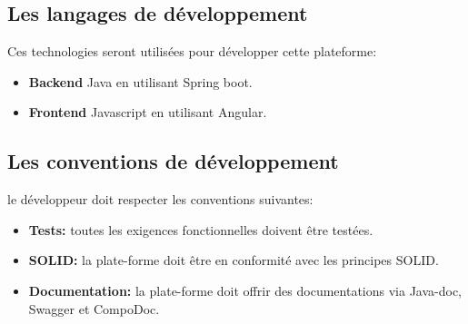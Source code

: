 \documentclass[oneside]{book}
\begin{document}
\subsection{Les langages de développement}
Ces technologies seront utilisées pour développer cette plateforme:
\begin{itemize}
    \item \textbf{Backend} Java en utilisant Spring boot.
    \item \textbf{Frontend} Javascript en utilisant Angular.
\end{itemize}

\subsection{Les conventions de développement}
le développeur doit respecter les conventions suivantes:
\begin{itemize}
    \item \textbf{Tests:} toutes les exigences fonctionnelles doivent être testées.
    \item \textbf{SOLID:} la plate-forme doit être en conformité avec les principes SOLID.
    \item \textbf{Documentation:} la plate-forme doit offrir des documentations via Java-doc, Swagger et CompoDoc.
\end{itemize}
\end{document}
